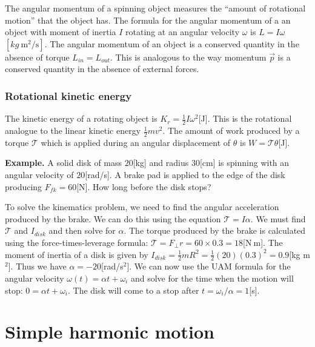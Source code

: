 \documentclass[letterpaper,9pt,journal]{IEEEtran}
\begin{document}
The angular momentum of a spinning object measures the ``amount of rotational motion''
that the object has.
The formula for the angular momentum of a an object with moment of inertia $I$
rotating at an angular velocity $\omega$ is $L = I \omega$~$[kg\:\text{m}^2/\text{s}]$.
The angular momentum of an object is a conserved quantity in the absence of torque
$L_{in} = L_{out}$. This is analogous to the way momentum $\vec{p}$ is a conserved quantity 
in the absence of external forces.


\subsubsection{Rotational kinetic energy}

The kinetic energy of a rotating object is $K_r = \frac{1}{2} I \omega^2$[J].
This is the rotational analogue to the linear kinetic energy $\frac{1}{2}mv^2$.
The amount of work produced by a torque $\mathcal{T}$ which is
applied during an angular displacement of $\theta$ is $W = \mathcal{T}\theta$[J].
%


{\bf Example.}  
A solid disk of mass $20$[kg] and radius $30$[cm] is spinning with an 
angular velocity of $20$[rad/s]. A brake pad is applied to the edge of the disk
producing $F_{fk}=60$[N].  How long before the disk stops?

To solve the kinematics problem, we need to find the angular acceleration
produced by the brake. We can do this using the equation $\mathcal{T}=I\alpha$.
We must find $\mathcal{T}$ and $I_{disk}$ and then solve for $\alpha$.
The torque produced by the brake is calculated using the force-times-leverage 
formula: $\mathcal{T}=F_{\perp}r= 60\times 0.3=18$[N$\:$m].
The moment of inertia of a disk is given by 
$I_{disk} = \frac{1}{2}mR^2=\frac{1}{2}(20)(0.3)^2=0.9$[kg m$^2$].
Thus we have $\alpha=-20$[rad/s$^2$].
We can now use the UAM formula for the angular velocity 
$\omega(t) = \alpha t + \omega_i$ and solve for the time
when the motion will stop: $0 = \alpha t + \omega_i$.
The disk will come to a stop after $t=\omega_i/\alpha = 1$[s].


\vspace{-1mm}
\section{Simple harmonic motion}
\label{sec:simple-harmonic-motion}
\end{document}
